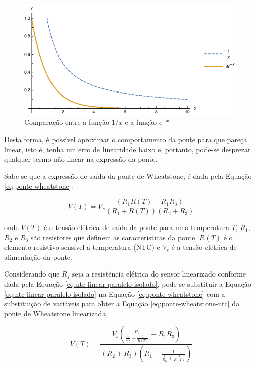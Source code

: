 \documentclass[a4paper]{instrumentacao}
\begin{document}
\begin{figure}[H]
\center
\includegraphics[width=\textwidth]{X1-vs-Exponencial.pdf}
\caption{Comparação entre a função $1/x$ e a função $e^{-x}$}
\label{fig:ntc-linear-funcao-comparacao}
\end{figure}

Desta forma, é possível aproximar o comportamento da ponte para que pareça linear, isto é, tenha um erro de linearidade baixo e, portanto, pode-se desprezar qualquer termo não linear na expressão da ponte.

Sabe-se que a expressão de saída da ponte de Wheatstone, é dada pela Equação \ref{eq:ponte-wheatstone}:

\begin{equation}
	V(T) = V_s \frac{(R_1 R(T)- R_1 R_3)}{(R_1+R(T)) (R_2+R_3)}
	\label{eq:ponte-wheatstone}
\end{equation}

\noindent onde $V(T)$ é a tensão elétrica de saída da ponte para uma temperatura $T$, $R_1$, $R_2$ e $R_3$ são resistores que definem as características da ponte, $R(T)$ é o elemento resistivo sensível a temperatura (NTC) e $V_s$ é a tensão elétrica de alimentação da ponte.

Considerando que $R_s$ seja a resistência elétrica do sensor linearizado conforme dada pela Equação \ref{eq:ntc-linear-paralelo-isolado}, pode-se substituir a Equação \ref{eq:ntc-linear-paralelo-isolado} na Equação \ref{eq:ponte-wheatstone} com a substituição de variáveis para obter a Equação \ref{eq:ponte-wheatstone-ntc} da ponte de Wheatstone linearizada.

\begin{equation}
	V(T) = \frac{V_s \left(\frac{R_1}{\frac{1}{R_L}+\frac{1}{R(T)}}-R_1 R_3\right)}{(R_2+R_3) \left(R_1+\frac{1}{\frac{1}{R_L}+\frac{1}{R(T)}}\right)}
	\label{eq:ponte-wheatstone-ntc}
\end{equation}
\end{document}
